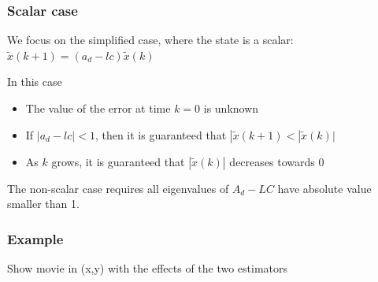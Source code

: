 \begin{frame}
	\frametitle{Scalar case}
	We focus on the simplified case, where the state is a scalar: $\tilde{x}(k+1)= (a_d-lc)\tilde{x}(k)$
	
	In this case %
	\begin{itemize}
		\item The value of the error at time $k=0$ is unknown
		\item If $|a_d-lc|<1$, then it is guaranteed that $|\tilde{x}(k+1)< |\tilde{x}(k)|$
		\item As $k$ grows, it is guaranteed that $|\tilde{x}(k)|$ decreases towards 0
	\end{itemize}

	The non-scalar case requires all eigenvalues of $A_d-LC$ have absolute value smaller than 1.\\
	
	
	
	
\end{frame}
\begin{frame}
    \frametitle{Example}
    Show movie in (x,y) with the effects of the two estimators
\end{frame}
	